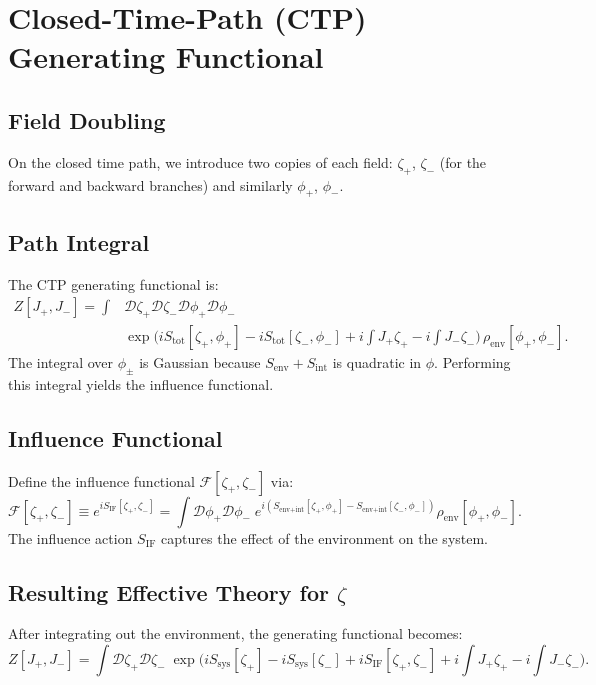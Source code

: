 \documentclass[12pt]{article}
\begin{document}
\section{Closed-Time-Path (CTP) Generating Functional}

\subsection{Field Doubling}
On the closed time path, we introduce two copies of each field: $\zeta_+$, $\zeta_-$ (for the forward and backward branches) and similarly $\phi_+$, $\phi_-$.

\subsection{Path Integral}
The CTP generating functional is:
\begin{align}
Z[J_+,J_-] = \int &\mathcal{D}\zeta_+ \mathcal{D}\zeta_- \mathcal{D}\phi_+ \mathcal{D}\phi_- \; \nonumber \\
&\exp\Big(i S_{\text{tot}}[\zeta_+,\phi_+] - i S_{\text{tot}}[\zeta_-,\phi_-] + i\int J_+ \zeta_+ - i\int J_- \zeta_- \Big) \, \rho_{\text{env}}[\phi_+,\phi_-].
\label{eq:ctp_genfunc}
\end{align}
The integral over $\phi_\pm$ is Gaussian because $S_{\text{env}} + S_{\text{int}}$ is quadratic in $\phi$. Performing this integral yields the influence functional.

\subsection{Influence Functional}
Define the influence functional $\mathcal{F}[\zeta_+,\zeta_-]$ via:
\begin{equation}
\mathcal{F}[\zeta_+,\zeta_-] \equiv e^{i S_{\text{IF}}[\zeta_+,\zeta_-]} = \int \mathcal{D}\phi_+ \mathcal{D}\phi_- \; e^{i (S_{\text{env+int}}[\zeta_+,\phi_+] - S_{\text{env+int}}[\zeta_-,\phi_-])} \rho_{\text{env}}[\phi_+,\phi_-].
\label{eq:influence_func}
\end{equation}
The influence action $S_{\text{IF}}$ captures the effect of the environment on the system.

\subsection{Resulting Effective Theory for $\zeta$}
After integrating out the environment, the generating functional becomes:
\begin{equation}
Z[J_+,J_-] = \int \mathcal{D}\zeta_+ \mathcal{D}\zeta_- \; \exp\Big(i S_{\text{sys}}[\zeta_+] - i S_{\text{sys}}[\zeta_-] + i S_{\text{IF}}[\zeta_+,\zeta_-] + i\int J_+ \zeta_+ - i\int J_- \zeta_- \Big).
\label{eq:effective_genfunc}
\end{equation}
\end{document}
